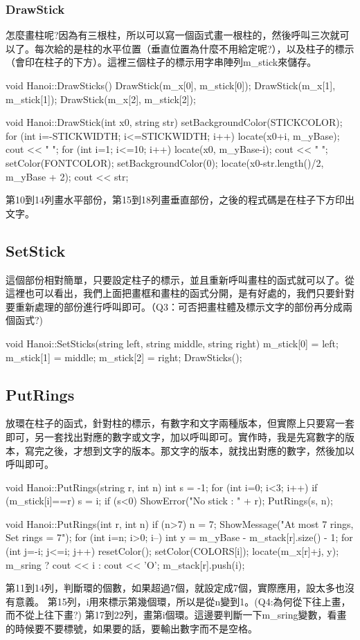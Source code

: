 \documentclass[12pt,a4paper]{article}
\begin{document}
\subsubsection{DrawStick}
怎麼畫柱呢?因為有三根柱，所以可以寫一個函式畫一根柱的，然後呼叫三次就可以了。每次給的是柱的水平位置（垂直位置為什麼不用給定呢?），以及柱子的標示（會印在柱子的下方）。這裡三個柱子的標示用字串陣列m\_stick來儲存。
\begin{cppcode}
void Hanoi::DrawSticks()
{
	DrawStick(m_x[0], m_stick[0]);
	DrawStick(m_x[1], m_stick[1]);
	DrawStick(m_x[2], m_stick[2]);
}

void Hanoi::DrawStick(int x0, string str)
{
	setBackgroundColor(STICKCOLOR);
	for (int i=-STICKWIDTH; i<=STICKWIDTH; i++) {
		locate(x0+i, m_yBase);
		cout << " ";
	}
	for (int i=1; i<=10; i++) {
		locate(x0, m_yBase-i);
		cout << " ";
	}
	setColor(FONTCOLOR);
	setBackgroundColor(0);
	locate(x0-str.length()/2, m_yBase + 2);
	cout << str;
}
\end{cppcode}	
第10到14列畫水平部份，第15到18列畫垂直部份，之後的程式碼是在柱子下方印出文字。

\subsection{SetStick}
這個部份相對簡單，只要設定柱子的標示，並且重新呼叫畫柱的函式就可以了。從這裡也可以看出，我們上面把畫框和畫柱的函式分開，是有好處的，我們只要針對要重新處理的部份進行呼叫即可。（Q3：可否把畫柱體及標示文字的部份再分成兩個函式?)
\begin{cppcode}
void Hanoi::SetSticks(string left, string middle, string right)
{
	m_stick[0] = left;
	m_stick[1] = middle;
	m_stick[2] = right;
	DrawSticks();
}
\end{cppcode}

\subsection{PutRings}
放環在柱子的函式，針對柱的標示，有數字和文字兩種版本，但實際上只要寫一套即可，另一套找出對應的數字或文字，加以呼叫即可。實作時，我是先寫數字的版本，寫完之後，才想到文字的版本。那文字的版本，就找出對應的數字，然後加以呼叫即可。
\begin{cppcode}
void Hanoi::PutRings(string r, int n)
{
	int s = -1;
	for (int i=0; i<3; i++) if (m_stick[i]==r) s = i;
	if (s<0) ShowError("No stick : " + r);
	PutRings(s, n);
}

void Hanoi::PutRings(int r, int n)
{
	if (n>7) {
		n = 7;
		ShowMessage("At most 7 rings, Set rings = 7");
	}
	for (int i=n; i>0; i--) {
		int y = m_yBase - m_stack[r].size() - 1;
		for (int j=-i; j<=i; j++) {
			resetColor();
			setColor(COLORS[i]);
			locate(m_x[r]+j, y);
			m_sring ? cout << i : cout << 'O';
		}
		m_stack[r].push(i);
	}
}
\end{cppcode}	
第11到14列，判斷環的個數，如果超過7個，就設定成7個，實際應用，設太多也沒有意義。
第15列，i用來標示第幾個環，所以是從n變到1。(Q4:為何從下往上畫，而不從上往下畫?)
第17到22列，畫第i個環。這邊要判斷一下m\_sring變數，看畫的時候要不要標號，如果要的話，要輸出數字而不是空格。
\end{document}

